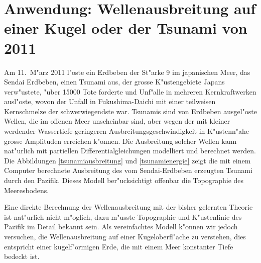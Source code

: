 %
%
%

\section{Anwendung: Wellenausbreitung auf einer Kugel oder der Tsunami von 2011}
Am 11.~M"arz 2011 l"oste ein Erdbeben der St"arke 9 im japanischen
Meer, das Sendai Erdbeben, einen Tsunami aus, der grosse K"ustengebiete
Japans verw"ustete, "uber
15000 Tote forderte und Unf"alle in mehreren Kernkraftwerken
ausl"oste, wovon der Unfall in Fukushima-Daichi mit einer
teilweisen Kernschmelze der schwerwiegendste war.
Tsunamis sind von Erdbeben ausgel"oste Wellen, die im offenen
Meer unscheinbar sind, aber wegen der mit kleiner werdender Wassertiefe
geringeren Ausbreitungsgeschwindigkeit in K"ustenn"ahe grosse
Amplituden erreichen k"onnen. Die Ausbreitung solcher Wellen
kann nat"urlich mit partiellen Differentialgleichungen modelliert
und berechnet werden. Die Abbildungen \ref{tsunamiausbreitung}
und \ref{tsunamienergie}
zeigt die mit einem Computer berechnete Ausbreitung des vom
Sendai-Erdbeben erzeugten Tsunami durch den Pazifik.
Dieses Modell ber"ucksichtigt offenbar die Topographie des
Meeresbodens.

Eine direkte Berechnung der Wellenausbreitung mit der bisher
gelernten Theorie ist nat"urlich nicht m"oglich, dazu m"usste
Topographie und K"ustenlinie des Pazifik im Detail bekannt
sein. Als vereinfachtes
Modell k"onnen wir jedoch versuchen, die Wellenausbreitung auf
einer Kugeloberfl"ache zu verstehen, dies entspricht einer 
kugelf"ormigen Erde, die mit einem Meer konstanter Tiefe bedeckt
ist.

